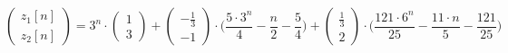 \begin{displaymath}
\begin{pmatrix}
z_1[n]
\\
z_2[n]
\end{pmatrix} = 3^n \cdot \begin{pmatrix}
1
\\
3
\end{pmatrix} + \begin{pmatrix}
- \frac{1}{3}
\\
- 1
\end{pmatrix} \cdot \Big ( \frac{5 \cdot 3^n}{4} - \frac{n}{2} - \frac{5}{4} \Big ) + \begin{pmatrix}
\frac{1}{3}
\\
2
\end{pmatrix} \cdot \Big ( \frac{121 \cdot 6^n}{25} - \frac{11 \cdot n}{5} - \frac{121}{25} \Big )
\end{displaymath}



